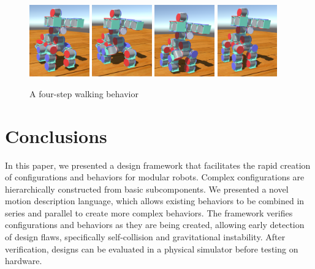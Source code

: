 \documentclass[graybox]{svmult}
\begin{document}
\begin{figure}
\begin{center}
                \includegraphics[width=0.23\textwidth]{images/library/unity/step1.png}
                \includegraphics[width=0.23\textwidth]{images/library/unity/step2.png}
                \includegraphics[width=0.23\textwidth]{images/library/unity/step3.png}
                \includegraphics[width=0.23\textwidth]{images/library/unity/step4.png}
\end{center}
\caption{A four-step walking behavior}
\label{fig:walk}
\end{figure}


\section{Conclusions}
In this paper, we presented a design framework that facilitates the rapid creation
of configurations and behaviors for modular robots.
Complex configurations  are hierarchically constructed from basic
subcomponents.
We presented a novel motion description language, which allows existing behaviors
to be combined in series and parallel  to create more complex  behaviors.
The framework verifies  configurations and behaviors as they are being created, allowing
early detection of  design flaws, specifically self-collision and gravitational instability. After
verification, designs can be evaluated in a physical simulator before testing on
hardware.
\end{document}
